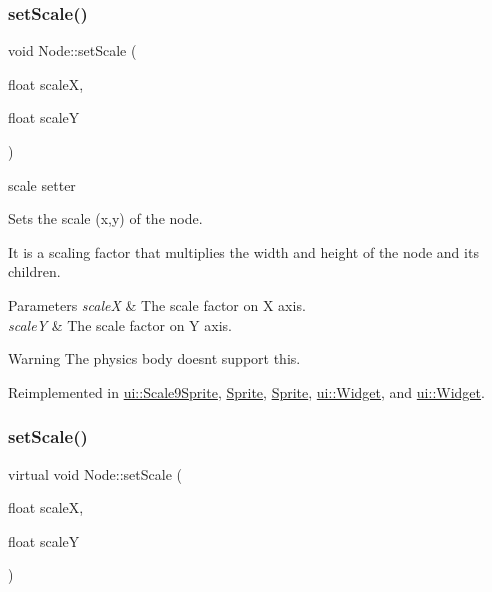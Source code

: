 \mbox{\label{classNode_a31f8130cfd505a5c327c4cc66fe4fa69}} 
\subsubsection{\texorpdfstring{set\+Scale()}{setScale()}\hspace{0.1cm}{\footnotesize\ttfamily [3/4]}}
{\footnotesize\ttfamily void Node\+::set\+Scale (\begin{DoxyParamCaption}\item[{float}]{scaleX,  }\item[{float}]{scaleY }\end{DoxyParamCaption})\hspace{0.3cm}{\ttfamily [virtual]}}



scale setter 

Sets the scale (x,y) of the node.

It is a scaling factor that multiplies the width and height of the node and its children.


\begin{DoxyParams}{Parameters}
{\em scaleX} & The scale factor on X axis. \\
\hline
{\em scaleY} & The scale factor on Y axis.\\
\hline
\end{DoxyParams}
\begin{DoxyWarning}{Warning}
The physics body doesn\textquotesingle{}t support this. 
\end{DoxyWarning}


Reimplemented in \hyperlink{classui_1_1Scale9Sprite_a5c98e355992ab8f4e4cfc2f4eac8e104}{ui\+::\+Scale9\+Sprite}, \hyperlink{classSprite_a52e1d2937d38baf4ad067f029e33b901}{Sprite}, \hyperlink{classSprite_aa91d58969ba99f1bfd3ade56bda6fc5c}{Sprite}, \hyperlink{classui_1_1Widget_a2ff6617263887b25fdb0ac06ac94f31a}{ui\+::\+Widget}, and \hyperlink{classui_1_1Widget_ace618234c5e35f66a9c569027cc9c5cf}{ui\+::\+Widget}.

\mbox{\label{classNode_a4a3e5ab7d2a14b166ba539f0db9010e3}} 
\subsubsection{\texorpdfstring{set\+Scale()}{setScale()}\hspace{0.1cm}{\footnotesize\ttfamily [4/4]}}
{\footnotesize\ttfamily virtual void Node\+::set\+Scale (\begin{DoxyParamCaption}\item[{float}]{scaleX,  }\item[{float}]{scaleY }\end{DoxyParamCaption})\hspace{0.3cm}{\ttfamily [virtual]}}


